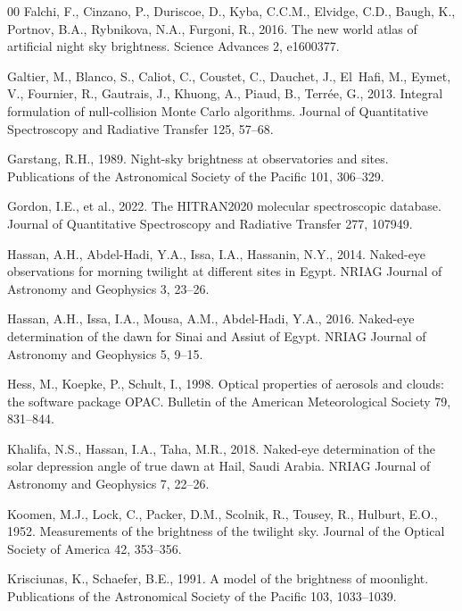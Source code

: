\documentclass[preprint,12pt]{elsarticle}
\begin{document}
\begin{thebibliography}{00}
Falchi, F., Cinzano, P., Duriscoe, D., Kyba, C.C.M., Elvidge, C.D.,
Baugh, K., Portnov, B.A., Rybnikova, N.A., Furgoni, R., 2016. The new
world atlas of artificial night sky brightness. Science Advances 2,
e1600377.

Galtier, M., Blanco, S., Caliot, C., Coustet, C., Dauchet, J.,
El~Hafi, M., Eymet, V., Fournier, R., Gautrais, J., Khuong, A.,
Piaud, B., Terr\'ee, G., 2013. Integral formulation of null-collision
Monte Carlo algorithms. Journal of Quantitative Spectroscopy and
Radiative Transfer 125, 57--68.

Garstang, R.H., 1989. Night-sky brightness at observatories and sites.
Publications of the Astronomical Society of the Pacific 101, 306--329.

Gordon, I.E., et al., 2022. The HITRAN2020 molecular spectroscopic
database. Journal of Quantitative Spectroscopy and Radiative Transfer
277, 107949.

Hassan, A.H., Abdel-Hadi, Y.A., Issa, I.A., Hassanin, N.Y., 2014.
Naked-eye observations for morning twilight at different sites in Egypt.
NRIAG Journal of Astronomy and Geophysics 3, 23--26.

Hassan, A.H., Issa, I.A., Mousa, A.M., Abdel-Hadi, Y.A., 2016. Naked-eye
determination of the dawn for Sinai and Assiut of Egypt. NRIAG Journal
of Astronomy and Geophysics 5, 9--15.

Hess, M., Koepke, P., Schult, I., 1998. Optical properties of aerosols
and clouds: the software package OPAC. Bulletin of the American
Meteorological Society 79, 831--844.

Khalifa, N.S., Hassan, I.A., Taha, M.R., 2018. Naked-eye determination of
the solar depression angle of true dawn at Hail, Saudi Arabia. NRIAG
Journal of Astronomy and Geophysics 7, 22--26.

Koomen, M.J., Lock, C., Packer, D.M., Scolnik, R., Tousey, R.,
Hulburt, E.O., 1952. Measurements of the brightness of the twilight sky.
Journal of the Optical Society of America 42, 353--356.

Krisciunas, K., Schaefer, B.E., 1991. A model of the brightness of
moonlight. Publications of the Astronomical Society of the Pacific 103,
1033--1039.


\end{thebibliography}
\end{document}
